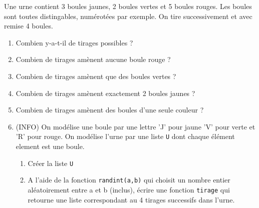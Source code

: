 \documentclass[a4paper, 11pt,reqno]{article}
\begin{document}
\begin{exercice}
Une urne contient 3 boules jaunes, 2 boules vertes et 5 boules rouges. Les boules sont toutes distingables, numérotées par exemple.  On tire successivement et avec remise 4 boules.
\begin{enumerate}
\item Combien y-a-t-il de tirages possibles ? 
\item Combien de tirages amènent aucune boule rouge ?
\item Combien de tirages amènent que des boules vertes ?
\item Combien de tirages amènent exactement 2 boules jaunes ?
\item Combien de tirages amènent des boules d'une seule couleur ?
\item (INFO) On modélise une boule par une lettre 'J' pour jaune 'V' pour verte et 'R' pour rouge. On modélise l'urne par une liste \texttt{U} dont chaque élément element est une boule. 
\begin{enumerate}
\item Créer la liste \texttt{U}
\item A l'aide de la fonction \texttt{randint(a,b)} qui choisit un nombre entier aléatoirement entre a et b (inclus), écrire une fonction \texttt{tirage} qui retourne une liste correspondant au 4 tirages successifs dans l'urne. 
\end{enumerate}
\end{enumerate}

\end{exercice}
\end{document}
